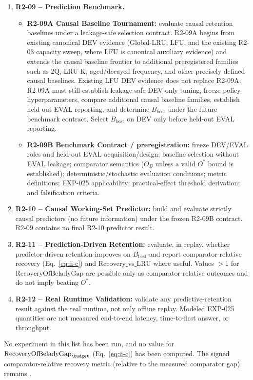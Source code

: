 \begin{enumerate}
 \item \textbf{R2-09 -- Prediction Benchmark.}
   \begin{itemize}
    \item \textbf{R2-09A Causal Baseline Tournament:} evaluate causal
      retention baselines under a leakage-safe selection contract. R2-09A
      begins from existing canonical DEV evidence (Global-LRU, LFU, and the
      existing R2-03 capacity sweep, where LFU is canonical auxiliary
      evidence) and extends the causal baseline frontier to additional
      preregistered families such as 2Q, LRU-K, aged/decayed frequency, and
      other precisely defined causal baselines. Existing LFU DEV evidence
      does not replace R2-09A: R2-09A must still establish leakage-safe
      DEV-only tuning, freeze policy hyperparameters, compare additional
      causal baseline families, establish held-out EVAL reporting, and
      determine $B_\mathrm{best}$ under the future benchmark contract.
      Select $B_\mathrm{best}$ on DEV only before held-out EVAL reporting.
    \item \textbf{R2-09B Benchmark Contract / preregistration:} freeze
      DEV/EVAL roles and held-out EVAL acquisition/design; baseline
      selection without EVAL leakage; comparator semantics ($O_B$ unless a
      valid $O^*$ bound is established); deterministic/stochastic
      evaluation conditions; metric definitions; EXP-025 applicability;
      practical-effect threshold derivation; and falsification criteria.
   \end{itemize}
 \item \textbf{R2-10 -- Causal Working-Set Predictor:} build and evaluate
   strictly causal predictors (no future information) under the frozen
   R2-09B contract. R2-09 contains no final R2-10 predictor result.
 \item \textbf{R2-11 -- Prediction-Driven Retention:} evaluate, in replay,
   whether predictor-driven retention improves on $B_\mathrm{best}$ and
   report comparator-relative recovery (Eq.~\ref{eq:ii-c}) and
   $\mathrm{Recovery\_vs\_LRU}$ where useful. Values $>1$ for
   $\mathrm{RecoveryOfBeladyGap}$ are possible only as comparator-relative
   outcomes and do not imply beating $O^*$.
 \item \textbf{R2-12 -- Real Runtime Validation:} validate any
   predictive-retention result against the real runtime, not only offline
   replay. Modeled EXP-025 quantities are not measured end-to-end latency,
   time-to-first answer, or throughput.
\end{enumerate}

No experiment in this list has been run, and no value for
$\mathrm{RecoveryOfBeladyGap}_\budget$ (Eq.~\ref{eq:ii-c}) has been
computed. The signed comparator-relative recovery metric (relative to the
measured comparator gap) remains \notyetmeasured{}.
